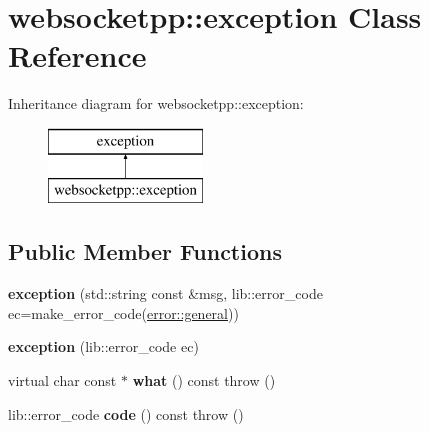\hypertarget{classwebsocketpp_1_1exception}{}\section{websocketpp\+:\+:exception Class Reference}
\label{classwebsocketpp_1_1exception}
Inheritance diagram for websocketpp\+:\+:exception\+:\begin{figure}[H]
\begin{center}
\leavevmode
\includegraphics[height=2.000000cm]{classwebsocketpp_1_1exception}
\end{center}
\end{figure}
\subsection*{Public Member Functions}
\begin{DoxyCompactItemize}
\item 
{\bfseries exception} (std\+::string const \&msg, lib\+::error\+\_\+code ec=make\+\_\+error\+\_\+code(\hyperlink{namespacewebsocketpp_1_1error_a0558d884e44e79146ad4947aea63f68da0cd3808919f43e5fbeee42fbcb808d66}{error\+::general}))\hypertarget{classwebsocketpp_1_1exception_af95696b245ec29c38666bf6ac00e95b2}{}\label{classwebsocketpp_1_1exception_af95696b245ec29c38666bf6ac00e95b2}

\item 
{\bfseries exception} (lib\+::error\+\_\+code ec)\hypertarget{classwebsocketpp_1_1exception_aa90a59ff911af87c912fde8ff4d44c92}{}\label{classwebsocketpp_1_1exception_aa90a59ff911af87c912fde8ff4d44c92}

\item 
virtual char const  $\ast$ {\bfseries what} () const  throw ()\hypertarget{classwebsocketpp_1_1exception_af774ced1072583eff949c307ff115922}{}\label{classwebsocketpp_1_1exception_af774ced1072583eff949c307ff115922}

\item 
lib\+::error\+\_\+code {\bfseries code} () const  throw ()\hypertarget{classwebsocketpp_1_1exception_a2ca743bae5d6ba2be63d1a64bc2f878f}{}\label{classwebsocketpp_1_1exception_a2ca743bae5d6ba2be63d1a64bc2f878f}

\end{DoxyCompactItemize}
